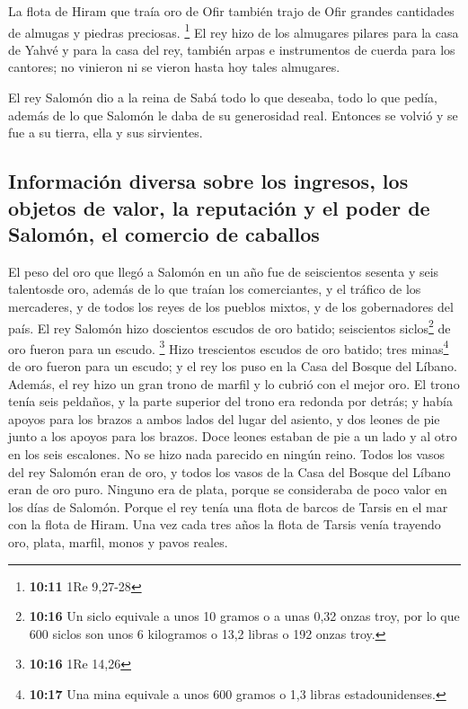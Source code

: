 \begin{paracol}{2}
 La flota de Hiram que traía oro de Ofir también trajo de
Ofir grandes cantidades de almugas y piedras preciosas. \footnote{\textbf{10:11}
  1Re 9,27-28}  El rey hizo de los almugares pilares para
la casa de Yahvé y para la casa del rey, también arpas e instrumentos de
cuerda para los cantores; no vinieron ni se vieron hasta hoy tales
almugares.

 El rey Salomón dio a la reina de Sabá todo lo que
deseaba, todo lo que pedía, además de lo que Salomón le daba de su
generosidad real. Entonces se volvió y se fue a su tierra, ella y sus
sirvientes.

\hypertarget{informaciuxf3n-diversa-sobre-los-ingresos-los-objetos-de-valor-la-reputaciuxf3n-y-el-poder-de-salomuxf3n-el-comercio-de-caballos}{%
\subsection{Información diversa sobre los ingresos, los objetos de
valor, la reputación y el poder de Salomón, el comercio de
caballos}\label{informaciuxf3n-diversa-sobre-los-ingresos-los-objetos-de-valor-la-reputaciuxf3n-y-el-poder-de-salomuxf3n-el-comercio-de-caballos}}

 El peso del oro que llegó a Salomón en un año fue de
seiscientos sesenta y seis talentosde oro,  además de lo
que traían los comerciantes, y el tráfico de los mercaderes, y de todos
los reyes de los pueblos mixtos, y de los gobernadores del país.
 El rey Salomón hizo doscientos escudos de oro batido;
seiscientos siclos\footnote{\textbf{10:16} Un siclo equivale a unos 10
  gramos o a unas 0,32 onzas troy, por lo que 600 siclos son unos 6
  kilogramos o 13,2 libras o 192 onzas troy.} de oro fueron para un
escudo. \footnote{\textbf{10:16} 1Re 14,26}  Hizo
trescientos escudos de oro batido; tres minas\footnote{\textbf{10:17}
  Una mina equivale a unos 600 gramos o 1,3 libras estadounidenses.} de
oro fueron para un escudo; y el rey los puso en la Casa del Bosque del
Líbano.  Además, el rey hizo un gran trono de marfil y lo
cubrió con el mejor oro.  El trono tenía seis peldaños, y
la parte superior del trono era redonda por detrás; y había apoyos para
los brazos a ambos lados del lugar del asiento, y dos leones de pie
junto a los apoyos para los brazos.  Doce leones estaban
de pie a un lado y al otro en los seis escalones. No se hizo nada
parecido en ningún reino.  Todos los vasos del rey
Salomón eran de oro, y todos los vasos de la Casa del Bosque del Líbano
eran de oro puro. Ninguno era de plata, porque se consideraba de poco
valor en los días de Salomón.  Porque el rey tenía una
flota de barcos de Tarsis en el mar con la flota de Hiram. Una vez cada
tres años la flota de Tarsis venía trayendo oro, plata, marfil, monos y
pavos reales.


\end{paracol}
